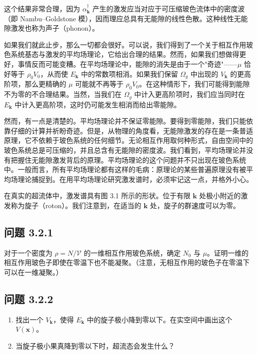 这个结果非常合理，因为 $\alpha_{\pmb{k}}^{\dagger}$ 产生的激发应当对应于可压缩玻色流体中的密度波（即 Nambu--Goldstone 模），因而理应总具有无能隙的线性色散。这种线性无能隙激发也称为声子（phonon）。

如果我们就此止步，那么一切都会很好。可以说，我们得到了一个关于相互作用玻色系统基态与激发的平均场理论，它给出合理的结果。然而，如果我们想做得更好，事情反而可能变糟。在平均场理论中，能隙的消失是由于一个"奇迹"——$\mu$ 恰好等于 $\rho_0V_0$，从而使 $E_{\pmb{k}}$ 中的常数项相消。如果我们保留 $\Omega_g$ 中出现的 $V_{\pmb{k}}$ 的更高阶项，那么更精确的 $\mu$ 可能就不再等于 $\rho_0V_0$。在这种情形下，我们可能得到能隙不为零的不合理结果。当然，当我们在 $\Omega_g$ 中计入更高阶项时，我们应当同时在 $E_{\pmb{k}}$ 中计入更高阶项，这时仍可能发生相消而给出零能隙。


然而，有一点是清楚的。平均场理论并不保证零能隙。要得到零能隙，我们只能依靠仔细的计算并祈盼奇迹。但是，从物理的角度看，无能隙激发的存在是一条普适原理，它不依赖于玻色系统的任何细节。无论相互作用取何种形式，自由空间中的玻色系统总是可压缩的，并且总含有无能隙的密度波。我们看到，平均场理论并没有把握住无能隙激发背后的原理。平均场理论的这个问题并不只出现在玻色系统中。一般而言，所有平均场理论都有这样的毛病：原理论的某些普遍原理没有被平均场理论捕捉到。在用平均场理论研究激发谱时，必须牢记这一点，并格外小心。

在真实的超流体中，激发谱具有图 3.1 所示的形状。位于有限 $\pmb{k}$ 处极小附近的激发称为旋子（roton）。我们注意到，在适当的 $\pmb{k}$ 处，旋子的群速度可以为零。

\subsection*{问题 3.2.1}

对于一个密度为 $\rho=N/\mathcal{V}$ 的一维相互作用玻色系统，确定 $N_0$ 与 $\mu$。证明一维的相互作用玻色子即使在零温下也不能凝聚。（注意，无相互作用的玻色子在零温下可以在一维凝聚。）

\subsection*{问题 3.2.2}

\begin{enumerate}
\item 找出一个 $V_{\pmb{k}}$，使得 $E_{\pmb{k}}$ 中的旋子极小降到零以下。在实空间中画出这个 $V(\pmb{x})$。
\item 当旋子极小果真降到零以下时，超流态会发生什么？
\end{enumerate}

